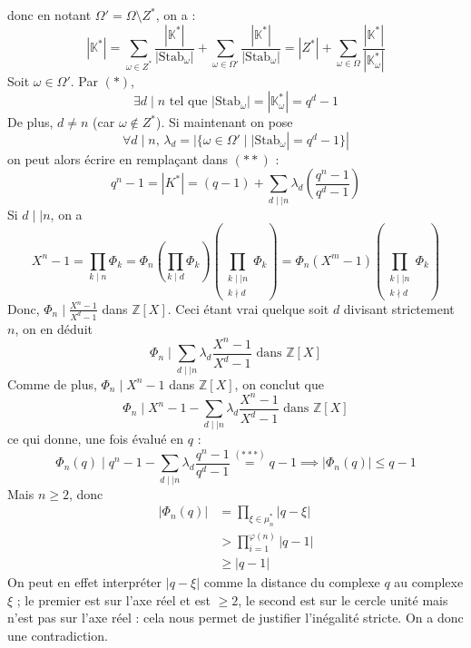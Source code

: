 \begin{demonstration}
\begin{itemize}
			donc en notant $\Omega' = \Omega \setminus Z^*$, on a :
			\[ |\mathbb{K}^*| = \sum_{\omega \in Z^*} \frac{|\mathbb{K}^*|}{|\mathrm{Stab}_\omega|} + \sum_{\omega \in \Omega'} \frac{|\mathbb{K}^*|}{|\mathrm{Stab}_\omega|} = |Z^*| + \sum_{\omega \in \Omega} \frac{|\mathbb{K}^*|}{|\mathbb{K}^*_\omega|} \tag{$**$} \]
			Soit $\omega \in \Omega'$. Par $(*)$,
			\[ \exists d \mid n \text{ tel que } |\mathrm{Stab}_\omega| = |\mathbb{K}^*_\omega| = q^d - 1 \]
			De plus, $d \neq n$ (car $\omega \notin Z^*$). Si maintenant on pose
			\[ \forall d \mid n, \, \lambda_d = |\{ \omega \in \Omega' \mid |\mathrm{Stab}_\omega| = q^d - 1 \}| \]
			on peut alors écrire en remplaçant dans $(**)$ :
			\[ q^n - 1 = |K^*| = (q - 1) + \sum_{d \mid \mid n} \lambda_d \left( \frac{q^n - 1}{q^d - 1} \right) \tag{$***$} \]
			Si $d \mid \mid n$, on a
			\[ X^n-1 = \prod_{k \mid n} \Phi_k = \Phi_n \left ( \prod_{k \mid d} \Phi_k \right ) \left ( \prod_{\substack{k \mid \mid n \\ k \nmid d}} \Phi_k \right ) = \Phi_n (X^m - 1) \left ( \prod_{\substack{k \mid \mid n \\ k \nmid d}} \Phi_k \right ) \]
			Donc, $\Phi_n \mid \frac{X^n - 1}{X^d - 1}$ dans $\mathbb{Z}[X]$. Ceci étant vrai quelque soit $d$ divisant strictement $n$, on en déduit
			\[ \Phi_n \mid \sum_{d \mid \mid n} \lambda_d \frac{X^n - 1}{X^d - 1} \text{ dans } \mathbb{Z}[X] \]
			Comme de plus, $\Phi_n \mid X^n - 1$ dans $\mathbb{Z}[X]$, on conclut que
			\[ \Phi_n \mid X^n - 1 - \sum_{d \mid \mid n} \lambda_d \frac{X^n - 1}{X^d - 1} \text{ dans } \mathbb{Z}[X] \]
			ce qui donne, une fois évalué en $q$ :
			\[ \Phi_n(q) \mid q^n - 1 - \sum_{d \mid \mid n} \lambda_d \frac{q^n - 1}{q^d - 1} \overset{(***)}{=} q-1 \implies |\Phi_n(q)| \leq q-1 \]
			Mais $n \geq 2$, donc
			\begin{align*}
				|\Phi_n(q)| &= \prod_{\xi \in \mu_n^*} |q - \xi| \\
				&> \prod_{i=1}^{\varphi(n)} |q - 1| \\
				&\geq |q-1|
			\end{align*}
			On peut en effet interpréter $|q - \xi|$ comme la distance du complexe $q$ au complexe $\xi$ ; le premier est sur l'axe réel et est $\geq 2$, le second est sur le cercle unité mais n'est pas sur l'axe réel :
			cela nous permet de justifier l'inégalité stricte. On a donc une contradiction.
		\end{itemize}
	\end{demonstration}

